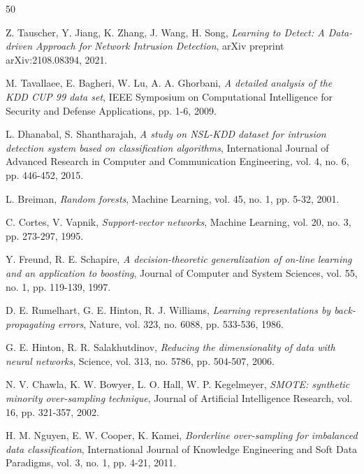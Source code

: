 \newpage
{}
\begin{thebibliography}{50}

Z. Tauscher, Y. Jiang, K. Zhang, J. Wang, H. Song, 
\textit{Learning to Detect: A Data-driven Approach for Network Intrusion Detection}, 
arXiv preprint arXiv:2108.08394, 2021.

M. Tavallaee, E. Bagheri, W. Lu, A. A. Ghorbani, 
\textit{A detailed analysis of the KDD CUP 99 data set}, 
IEEE Symposium on Computational Intelligence for Security and Defense Applications, pp. 1-6, 2009.

L. Dhanabal, S. Shantharajah, 
\textit{A study on NSL-KDD dataset for intrusion detection system based on classification algorithms}, 
International Journal of Advanced Research in Computer and Communication Engineering, vol. 4, no. 6, pp. 446-452, 2015.

L. Breiman, 
\textit{Random forests}, 
Machine Learning, vol. 45, no. 1, pp. 5-32, 2001.

C. Cortes, V. Vapnik, 
\textit{Support-vector networks}, 
Machine Learning, vol. 20, no. 3, pp. 273-297, 1995.

Y. Freund, R. E. Schapire, 
\textit{A decision-theoretic generalization of on-line learning and an application to boosting}, 
Journal of Computer and System Sciences, vol. 55, no. 1, pp. 119-139, 1997.

D. E. Rumelhart, G. E. Hinton, R. J. Williams, 
\textit{Learning representations by back-propagating errors}, 
Nature, vol. 323, no. 6088, pp. 533-536, 1986.

G. E. Hinton, R. R. Salakhutdinov, 
\textit{Reducing the dimensionality of data with neural networks}, 
Science, vol. 313, no. 5786, pp. 504-507, 2006.

N. V. Chawla, K. W. Bowyer, L. O. Hall, W. P. Kegelmeyer, 
\textit{SMOTE: synthetic minority over-sampling technique}, 
Journal of Artificial Intelligence Research, vol. 16, pp. 321-357, 2002.

H. M. Nguyen, E. W. Cooper, K. Kamei, 
\textit{Borderline over-sampling for imbalanced data classification}, 
International Journal of Knowledge Engineering and Soft Data Paradigms, vol. 3, no. 1, pp. 4-21, 2011.


\end{thebibliography}
